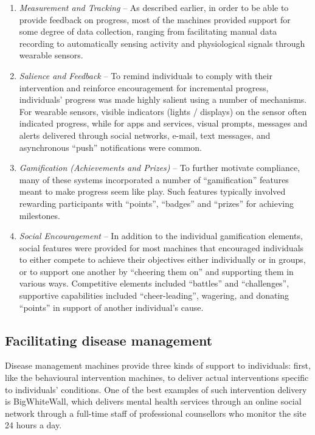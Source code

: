 \documentclass{www13-companion-accepted}
\begin{document}
\begin{enumerate}
\item \emph{Measurement and Tracking} -- As described earlier, in order
  to be able to provide feedback on progress, most of the machines
  provided support for some degree of data collection, ranging from
  facilitating manual data recording to automatically sensing activity
  and physiological signals through wearable sensors.
\item \emph{Salience and Feedback} -- To remind individuals to comply
  with their intervention and reinforce encouragement for incremental
  progress, individuals' progress was made highly salient using a
  number of mechanisms.  For wearable sensors, visible indicators
  (lights / displays) on the sensor often indicated progress, while for
  apps and services, visual prompts, messages and alerts delivered
  through social networks, e-mail, text messages, and asynchronous
  ``push'' notifications were common.
\item \emph{Gamification (Achievements and Prizes)} -- To further
  motivate compliance, many of these systems incorporated a number of
  ``gamification'' features \cite{Deterding:2011:GUG:1979742.1979575}
  meant to make progress seem like play.  Such features typically
  involved rewarding participants with ``points'', ``badges'' and
  ``prizes'' for achieving milestones.
\item \emph{Social Encouragement} -- In addition to the individual
  gamification elements, social features were provided for most
  machines that encouraged individuals to either compete to achieve
  their objectives either individually or in groups, or to support one
  another by ``cheering them on'' and supporting them in various ways.
  Competitive elements included ``battles'' and ``challenges'', supportive
  capabilities included ``cheer-leading'', wagering, and donating ``points''
  in support of another individual's cause.
\end{enumerate}

\subsection{Facilitating disease management}
Disease management machines provide three kinds of support to
individuals: first, like the behavioural intervention machines, to
deliver actual interventions specific to individuals' conditions.  One
of the best examples of such intervention delivery is BigWhiteWall,
which delivers mental health services through an online social network
through a full-time staff of professional counsellors who monitor the
site 24 hours a day.
\end{document}
